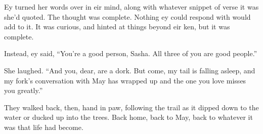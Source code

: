 Ey turned her words over in eir mind, along with whatever snippet of verse it was she'd quoted. The thought was complete. Nothing ey could respond with would add to it. It was curious, and hinted at things beyond eir ken, but it was complete.

Instead, ey said, ``You're a good person, Sasha. All three of you are good people.''

She laughed. ``And you, dear, are a dork. But come, my tail is falling asleep, and my fork's conversation with May has wrapped up and the one you love misses you greatly.''

They walked back, then, hand in paw, following the trail as it dipped down to the water or ducked up into the trees. Back home, back to May, back to whatever it was that life had become.
